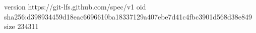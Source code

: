 version https://git-lfs.github.com/spec/v1
oid sha256:d398934459d18eac6696610ba18337129a407ebe7d41c4fbc3901d568d38e849
size 234311

